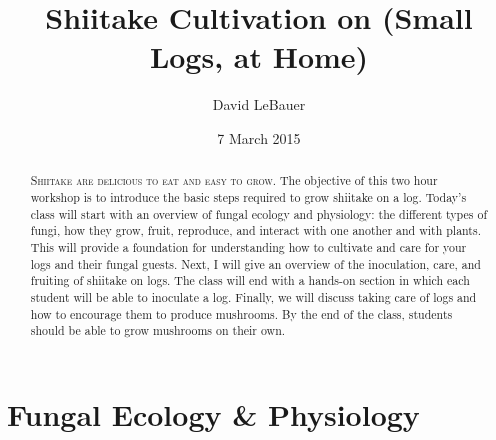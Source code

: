 \documentclass{tufte-handout}
\title{Shiitake Cultivation on (Small Logs, at Home)}
\author{David LeBauer}
\date{7 March 2015}  %
\begin{document}
\maketitle%


\begin{abstract}
\noindent \textsc{Shiitake are delicious to eat and easy to grow.}
The objective of this two hour workshop is to introduce the basic steps required to grow shiitake on a log.
Today's class will start with an overview of fungal ecology and physiology: the different types of fungi, how they grow, fruit, reproduce, and interact with one another and with plants.
This will provide a foundation for understanding how to cultivate and care for your logs and their fungal guests. Next, I will give an overview of the inoculation, care, and fruiting of shiitake on logs. The class will end with a hands-on section in which each student will be able to inoculate a log. 
Finally, we will discuss taking care of logs and how to encourage them to produce mushrooms. 
By the end of the class, students should be able to grow mushrooms on their own.
\end{abstract}




\section{Fungal Ecology \&  Physiology}
\end{document}

